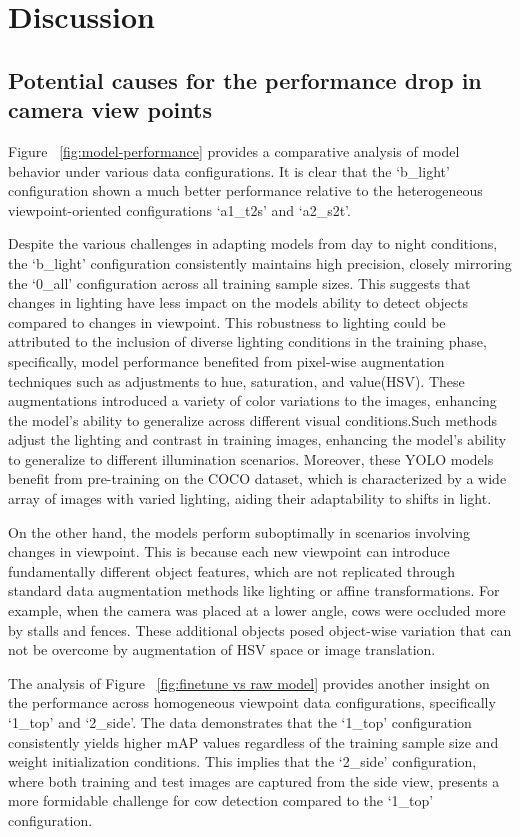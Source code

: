 \section{Discussion}


\subsection{Potential causes for the performance drop in camera view points}

Figure ~\ref{fig:model-performance} provides a comparative analysis of model behavior under various data configurations. It is clear that the `b\_light' configuration shown a much better performance relative to the heterogeneous viewpoint-oriented configurations `a1\_t2s' and `a2\_s2t'.

Despite the various challenges in adapting models from day to night conditions, the `b\_light' configuration consistently maintains high precision, closely mirroring the `0\_all' configuration across all training sample sizes. This suggests that changes in lighting have less impact on the models ability to detect objects compared to changes in viewpoint. This robustness to lighting could be attributed to the inclusion of diverse lighting conditions in the training phase, specifically, model performance benefited from pixel-wise augmentation techniques such as adjustments to hue, saturation, and value(HSV). These augmentations introduced a variety of color variations to the images, enhancing the model's ability to generalize across different visual conditions.Such methods adjust the lighting and contrast in training images, enhancing the model's ability to generalize to different illumination scenarios. Moreover, these YOLO models benefit from pre-training on the COCO dataset, which is characterized by a wide array of images with varied lighting, aiding their adaptability to shifts in light.

On the other hand, the models perform suboptimally in scenarios involving changes in viewpoint. This is because each new viewpoint can introduce fundamentally different object features, which are not replicated through standard data augmentation methods like lighting or affine transformations. For example, when the camera was placed at a lower angle, cows were occluded more by stalls and fences. These additional objects posed object-wise variation that can not be overcome by augmentation of HSV space or image translation.

The analysis of Figure ~\ref{fig:finetune vs raw model} provides another insight on the performance across homogeneous viewpoint data configurations, specifically `1\_top' and `2\_side'. The data demonstrates that the `1\_top' configuration consistently yields higher mAP values regardless of the training sample size and weight initialization conditions. This implies that the `2\_side' configuration, where both training and test images are captured from the side view, presents a more formidable challenge for cow detection compared to the `1\_top' configuration.

